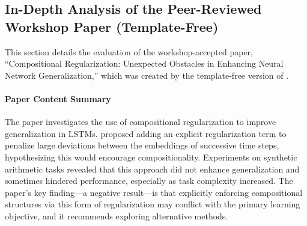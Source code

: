 \begin{appendices}
\subsection{In-Depth Analysis of the Peer-Reviewed Workshop Paper (Template-Free)}
\label{app:case_study_v2}
This section details the evaluation of the workshop-accepted paper, ``Compositional Regularization: Unexpected Obstacles in Enhancing Neural Network Generalization,'' which was created by the template-free version of \ouralgo.

\paragraph{Paper Content Summary}
The paper investigates the use of compositional regularization to improve generalization in LSTMs. \ouralgo proposed adding an explicit regularization term to penalize large deviations between the embeddings of successive time steps, hypothesizing this would encourage compositionality. Experiments on synthetic arithmetic tasks revealed that this approach did not enhance generalization and sometimes hindered performance, especially as task complexity increased. The paper's key finding—a negative result—is that explicitly enforcing compositional structures via this form of regularization may conflict with the primary learning objective, and it recommends exploring alternative methods.


\end{appendices}
